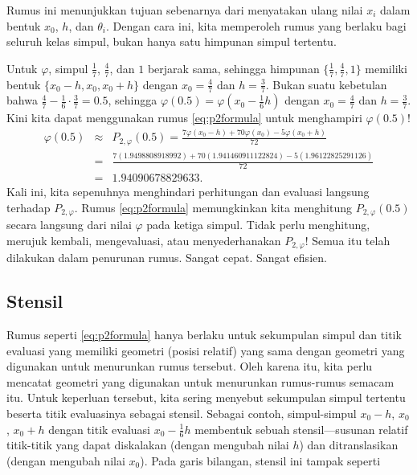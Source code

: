 \noindent Rumus ini menunjukkan tujuan sebenarnya dari menyatakan
ulang nilai $x_{i}$ dalam bentuk $x_{0}$, $h$, dan $\theta_{i}$.
Dengan cara ini, kita memperoleh rumus yang berlaku bagi seluruh kelas
simpul, bukan hanya satu himpunan simpul tertentu.

Untuk $\varphi$, simpul $\frac{1}{7}$, $\frac{4}{7}$, dan $1$
berjarak sama, sehingga himpunan $\{\frac{1}{7},\frac{4}{7},1\}$
memiliki bentuk $\{x_{0}-h,x_{0},x_{0}+h\}$ dengan $x_{0}=\frac{4}{7}$
dan $h=\frac{3}{7}$. Bukan suatu kebetulan bahwa $\frac{4}{7}-\frac{1}{6}\cdot\frac{3}{7}=0.5$,
sehingga $\varphi(0.5)=\varphi(x_{0}-\frac{1}{6}h)$ dengan $x_{0}=\frac{4}{7}$
dan $h=\frac{3}{7}$. Kini kita dapat menggunakan rumus \ref{eq:p2formula}
untuk menghampiri $\varphi(0.5)$!
\begin{eqnarray*}
\varphi(0.5) & \approx & P_{2,\varphi}(0.5)=\frac{7\varphi(x_{0}-h)+70\varphi(x_{0})-5\varphi(x_{0}+h)}{72}\\
 & = & \frac{7(1.9498808918992)+70(1.941460911122824)-5(1.96122825291126)}{72}\\
 & = & 1.94090678829633.
\end{eqnarray*}
Kali ini, kita sepenuhnya menghindari perhitungan dan evaluasi langsung
terhadap $P_{2,\varphi}$. Rumus \ref{eq:p2formula} memungkinkan
kita menghitung $P_{2,\varphi}(0.5)$ secara langsung dari nilai $\varphi$
pada ketiga simpul. Tidak perlu menghitung, merujuk kembali, mengevaluasi,
atau menyederhanakan $P_{2,\varphi}$! Semua itu telah dilakukan dalam
penurunan rumus. Sangat cepat. Sangat efisien.

\subsection{Stensil}

Rumus seperti \ref{eq:p2formula} hanya berlaku untuk sekumpulan simpul
dan titik evaluasi yang memiliki geometri (posisi relatif) yang sama
dengan geometri yang digunakan untuk menurunkan rumus tersebut. Oleh
karena itu, kita perlu mencatat geometri yang digunakan untuk menurunkan
rumus-rumus semacam itu. Untuk keperluan tersebut, kita sering menyebut
sekumpulan simpul tertentu beserta titik evaluasinya sebagai stensil.
Sebagai contoh, simpul-simpul $x_{0}-h$, $x_{0}$, $x_{0}+h$ dengan
titik evaluasi $x_{0}-\frac{1}{6}h$ membentuk sebuah stensil---susunan
relatif titik-titik yang dapat diskalakan (dengan mengubah nilai $h$)
dan ditranslasikan (dengan mengubah nilai $x_{0}$). Pada garis bilangan,
stensil ini tampak seperti

